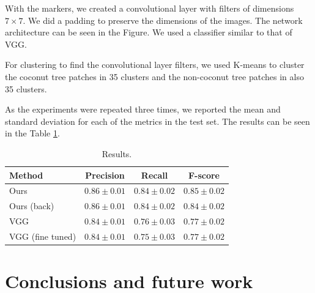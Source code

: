 \documentclass[10pt,twocolumn,letterpaper]{article}
\begin{document}
With the markers, we created a convolutional layer with filters of dimensions $7 \times 7$. We did a padding to preserve the dimensions of the images. The network architecture can be seen in the Figure. We used a classifier similar to that of VGG.

For clustering to find the convolutional layer filters, we used K-means to cluster the coconut tree patches in 35 clusters and the non-coconut tree patches in also 35 clusters.

As the experiments were repeated three times, we reported the mean and standard deviation for each of the metrics in the test set. The results can be seen in the Table \ref{tab:results}.

\begin{table}[h]
  \begin{center}
  \begin{tabular}{|l|c|c|c|}
  \hline
   Method & Precision & Recall & F-score \\
  \hline\hline
  Ours & $0.86 \pm 0.01$ & $0.84 \pm 0.02$ & $0.85 \pm 0.02$\\
  Ours (back) & $0.86 \pm 0.01$ & $0.84 \pm 0.02$ & $0.84 \pm 0.02$\\
  VGG & $0.84 \pm 0.01$ & $0.76 \pm 0.03$ & $0.77 \pm 0.02 $ \\
  VGG (fine tuned) & $0.84 \pm 0.01$ & $0.75 \pm 0.03$ & $0.77 \pm 0.02 $ \\
  \hline
  \end{tabular}
  \end{center}
  \caption{Results.}
  \label{tab:results}
  \end{table}
  

\section{Conclusions and future work}

{\small


}
\end{document}
